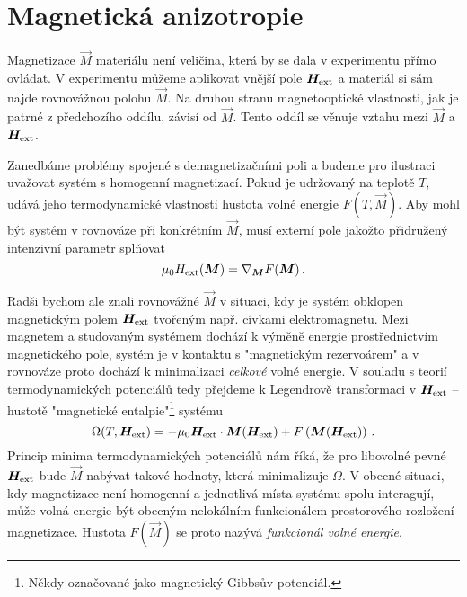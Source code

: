 \section{Magnetická anizotropie}
\label{chap:magneticka-anizotropie}

Magnetizace $\vec{M}$ materiálu není veličina, která by se dala v experimentu přímo ovládat.
V experimentu můžeme aplikovat vnější pole $\bm{H}_\textrm{ext}$ a materiál si sám najde rovnovážnou polohu $\vec{M}$.
Na druhou stranu magnetooptické vlastnosti, jak je patrné z předchozího oddílu, závisí od $\vec{M}$.
Tento oddíl se věnuje vztahu mezi $\vec{M}$ a $\bm{H}_\textrm{ext}$.

Zanedbáme problémy spojené s demagnetizačními poli a budeme pro ilustraci uvažovat systém s homogenní magnetizací.
Pokud je udržovaný na teplotě $T$, udává jeho termodynamické vlastnosti hustota volné energie $F(T,\vec{M})$. 
Aby mohl být systém v rovnováze při konkrétním $\vec{M}$, musí externí pole jakožto přidružený intenzivní parametr splňovat
\begin{equation} 
\label{eqn:Hext=gradF}
    \mu_0H_\textrm{ext}(\bm{M}) = \nabla_{\bm{M}} F(\bm{M}) \,.
\end{equation}

Radši bychom ale znali rovnovážné $\vec{M}$ v situaci, kdy je systém obklopen magnetickým polem $\bm{H}_\textrm{ext}$ tvořeným např. cívkami elektromagnetu.
Mezi magnetem a studovaným systémem dochází k výměně energie prostřednictvím magnetického pole, systém je v kontaktu s "magnetickým rezervoárem" a v rovnováze proto dochází k minimalizaci \emph{celkové} volné energie.
V souladu s teorií termodynamických potenciálů tedy přejdeme k Legendrově transformaci v $\bm{H}_\textrm{ext}$ --\tododash hustotě "magnetické entalpie"\footnote{Někdy označované jako magnetický Gibbsův potenciál.} systému
\begin{equation} 
\label{eqn:magneticka-entalpie}
    \Omega(T,\bm{H}_\textrm{ext})= -\mu_0\bm{H}_\textrm{ext}\cdot\bm{M}(\bm{H}_\textrm{ext})+F\left(\bm{M}(\bm{H}_\textrm{ext})\right) \,.
\end{equation}
Princip minima termodynamických potenciálů nám říká, že pro libovolné pevné $\bm{H}_\textrm{ext}$ bude $\vec{M}$ nabývat takové hodnoty, která minimalizuje $\Omega$.
V obecné situaci, kdy magnetizace není homogenní a jednotlivá místa systému spolu interagují, může volná energie být obecným nelokálním funkcionálem prostorového rozložení magnetizace.
Hustota $F(\vec{M})$ se proto nazývá \emph{funkcionál volné energie}.

